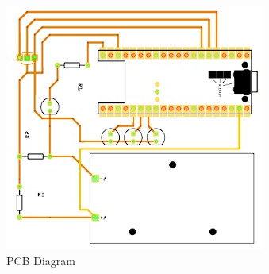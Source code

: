 \begin{figure}[htbp]
    \centering
    \includegraphics[width=\linewidth]{images/pcbDiagram}
    \caption{PCB Diagram}
    \label{fig:pcbDiagram}
\end{figure}